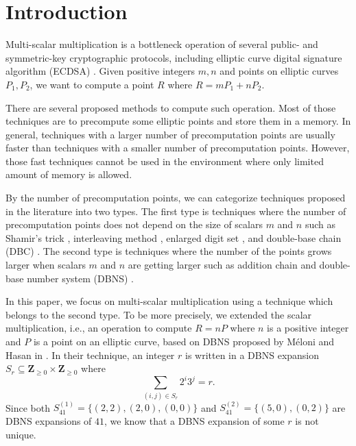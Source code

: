 \section{Introduction}

Multi-scalar multiplication is a bottleneck operation of several public- and symmetric-key cryptographic protocols,
including elliptic curve digital signature algorithm (ECDSA) \cite{ECDSA}.
Given positive integers $m, n$ and points on elliptic curves $P_1, P_2$,
we want to compute a point $R$ where
$R = m P_1 + n P_2.$

There are several proposed methods to compute such operation.
Most of those techniques are to precompute some elliptic points and store them in a memory.
In general, techniques with a larger number of precomputation points are usually faster than techniques with a smaller number of precomputation points.
However, those fast techniques cannot be used in the environment where only limited amount of memory is allowed.

By the number of precomputation points, we can categorize techniques proposed in the literature into two types.
The first type is techniques where the number of precomputation points does not depend on the size of scalars $m$ and $n$ such as Shamir’s trick \cite{Shamir},
interleaving method \cite{interleaving}, enlarged digit set \cite{enlarged2,enlarged4,enlarged1,enlarged3}, and double-base chain (DBC) \cite{dbc2,dbc3,DKS09}.
The second type is techniques where the number of the points grows larger when scalars $m$ and $n$ are getting larger such as addition chain \cite{additionChain1,additionChain2}
and double-base number system (DBNS)  \cite{MH09}.

In this paper, we focus on multi-scalar multiplication using a technique which belongs to the second type.
To be more precisely, we extended the scalar multiplication, i.e., an operation to compute $R = nP$ where $n$ is a positive integer and $P$ is a point on an elliptic curve,
based on DBNS proposed by M\'eloni and Hasan in \cite{MH09}.
In their technique, an integer $r$ is written in a DBNS expansion $S_r \subseteq \mathbf{Z}_{\geq 0} \times \mathbf{Z}_{\geq 0}$ where
$$\sum_{(i,j) \in S_r} 2^i 3^j = r.$$ 
Since both $S^{(1)}_{41} = \{(2,2), (2,0), (0,0)\}$ and $S^{(2)}_{41} = \{(5,0), (0,2)\}$ are DBNS expansions of $41$, we know that a DBNS expansion of some $r$ is not unique.

